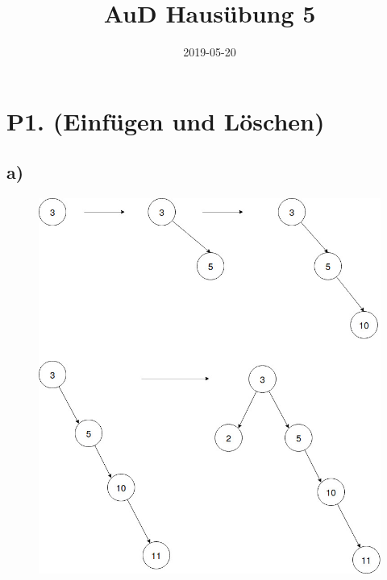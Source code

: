 \documentclass{article}
\title{AuD Hausübung 5}
\date{2019-05-20}
\begin{document}
	\maketitle
	\newpage
	
	\section*{P1. (Einfügen und Löschen)}
	
	\subsection*{a)}
	\begin{figure}[h!]
		\centering
		\includegraphics[width=\linewidth]{binaryTree.jpg}
	\end{figure}
	
\end{document}
